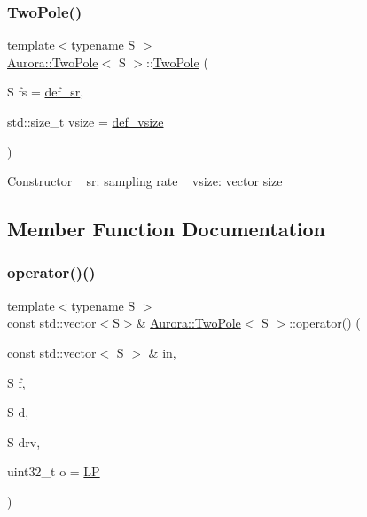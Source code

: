 \subsubsection{\texorpdfstring{Two\+Pole()}{TwoPole()}\hspace{0.1cm}{\footnotesize\ttfamily [2/2]}}
{\footnotesize\ttfamily template$<$typename S $>$ \\
\hyperlink{class_aurora_1_1_two_pole}{Aurora\+::\+Two\+Pole}$<$ S $>$\+::\hyperlink{class_aurora_1_1_two_pole}{Two\+Pole} (\begin{DoxyParamCaption}\item[{S}]{fs = {\ttfamily \hyperlink{namespace_aurora_ad49263d809bea98dd422e95bc91bc03e}{def\+\_\+sr}},  }\item[{std\+::size\+\_\+t}]{vsize = {\ttfamily \hyperlink{namespace_aurora_afaaddf667a06e7ce23c667a8b7295263}{def\+\_\+vsize}} }\end{DoxyParamCaption})\hspace{0.3cm}{\ttfamily [inline]}}

Constructor ~\newline
sr\+: sampling rate ~\newline
vsize\+: vector size 

\subsection{Member Function Documentation}
\mbox{\label{class_aurora_1_1_two_pole_a1b90d66b3f3e7a14b21ccbab94f56d3e}} 
\subsubsection{\texorpdfstring{operator()()}{operator()()}\hspace{0.1cm}{\footnotesize\ttfamily [1/4]}}
{\footnotesize\ttfamily template$<$typename S $>$ \\
const std\+::vector$<$S$>$\& \hyperlink{class_aurora_1_1_two_pole}{Aurora\+::\+Two\+Pole}$<$ S $>$\+::operator() (\begin{DoxyParamCaption}\item[{const std\+::vector$<$ S $>$ \&}]{in,  }\item[{S}]{f,  }\item[{S}]{d,  }\item[{S}]{drv,  }\item[{uint32\+\_\+t}]{o = {\ttfamily \hyperlink{namespace_aurora_a935301c39e9550e3c46ebe8dc165165faa9f81f17c7244e2198dba962e817cf89}{LP}} }\end{DoxyParamCaption})\hspace{0.3cm}{\ttfamily [inline]}}


